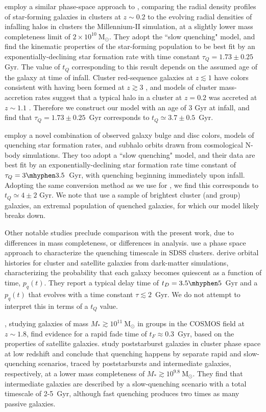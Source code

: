 \citet{Haines:2015aa} employ a similar phase-space approach to \citet{Muzzin:2014aa}, comparing the radial density profiles of star-forming galaxies in clusters at $z\sim0.2$ to the evolving radial densities of infalling halos in clusters the Millennium-\textsc{II} simulation, at a slightly lower mass completeness limit of $2\times10^{10}~ \mathrm{M}_\odot$.
They adopt the ``slow quenching" model, and find the kinematic properties of the star-forming population to be best fit by an exponentially-declining star formation rate with time constant $\tau_Q=1.73\pm0.25$~ Gyr.
The value of $t_Q$ corresponding to this result depends on the assumed age of the galaxy at time of infall.
Cluster red-sequence galaxies at $z \lesssim 1$ have colors consistent with having been formed at $z \gtrsim 3$ \citep{Foltz:2015aa}, and models of cluster mass-accretion rates suggest that a typical halo in a cluster at $z=0.2$ was accreted at $z\sim1.1$ \citep{Fossati:2017aa}.
Therefore we construct our model with an age of 3 Gyr at infall, and find that $\tau_Q=1.73\pm0.25$~Gyr corresponds to $t_Q\simeq3.7\pm0.5$~Gyr.

\citet{Taranu:2014aa} employ a novel combination of observed galaxy bulge and disc colors, models of quenching star formation rates, and subhalo orbits drawn from cosmological N-body simulations.
They too adopt a ``slow quenching" model, and their data are best fit by an exponentially-declining star formation rate time constant of $\tau_Q=3\mhyphen3.5$~Gyr, with quenching beginning immediately upon infall.
Adopting the same conversion method as we use for \citet{Haines:2015aa}, we find this corresponds to $t_Q\simeq4\pm2$ Gyr.
We note that \citet{Taranu:2014aa} use a sample of brightest cluster (and group) galaxies, an extremal population of quenched galaxies, for which our model likely breaks down.

Other notable studies preclude comparison with the present work, due to differences in mass completeness, or differences in analysis.
\citet{Oman:2016aa} use a phase space approach to characterize the quenching timescale in SDSS clusters.
\citet{Oman:2016aa} derive orbital histories for cluster and satellite galaxies from dark-matter simulations, characterizing the probability that each galaxy becomes quiescent as a function of time, $p_q(t)$.
They report a typical delay time of $t_D=3.5\mhyphen5$~Gyr and a $p_q(t)$ that evolves with a time constant $\tau\lesssim2$~Gyr.
We do not attempt to interpret this in terms of a $t_Q$ value.

\citet{Gobat:2015aa}, studying galaxies of mass $M_* \gtrsim 10^{11}~ \mathrm{M}_\odot$ in groups in the COSMOS field at $z\sim1.8$, find evidence for a rapid fade time of $t_F\approx0.3$~Gyr, based on the properties of satellite galaxies.
\citet{Paccagnella:2016aa,Paccagnella:2017aa} study poststarburst galaxies in cluster phase space at low redshift and conclude that quenching happens by separate rapid and slow-quenching scenarios, traced by poststarbursts and intermediate galaxies, respectively, at a lower mass completeness of $M_* \gtrsim 10^{9.8}~\mathrm{M}_\odot$.
They find that intermediate galaxies are described by a slow-quenching scenario with a total timescale of 2-5~Gyr, although fast quenching produces two times as many passive galaxies.

